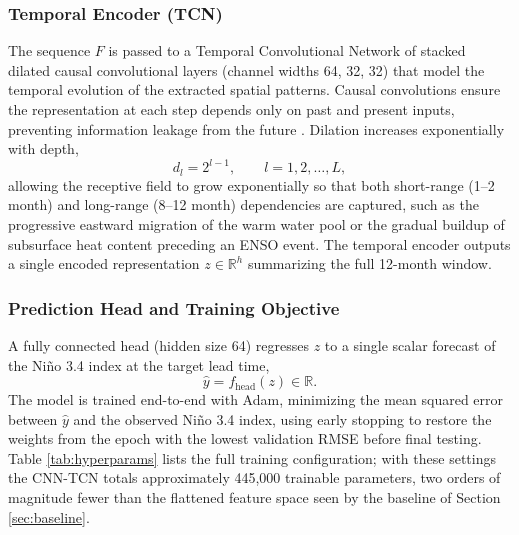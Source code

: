 \documentclass[conference]{IEEEtran}
\begin{document}
\subsubsection{Temporal Encoder (TCN)}
The sequence $F$ is passed to a Temporal Convolutional Network of stacked dilated causal convolutional layers (channel widths 64, 32, 32) that model the temporal evolution of the extracted spatial patterns. Causal convolutions ensure the representation at each step depends only on past and present inputs, preventing information leakage from the future \cite{bai2018}. Dilation increases exponentially with depth,
\begin{equation}
d_l = 2^{l-1}, \qquad l = 1, 2, \ldots, L,
\label{eq:dilation}
\end{equation}
allowing the receptive field to grow exponentially so that both short-range (1--2 month) and long-range (8--12 month) dependencies are captured, such as the progressive eastward migration of the warm water pool or the gradual buildup of subsurface heat content preceding an ENSO event. The temporal encoder outputs a single encoded representation $z \in \mathbb{R}^h$ summarizing the full 12-month window.

\subsubsection{Prediction Head and Training Objective}
A fully connected head (hidden size 64) regresses $z$ to a single scalar forecast of the Ni\~no 3.4 index at the target lead time,
\begin{equation}
\hat{y} = f_{\mathrm{head}}(z) \in \mathbb{R}.
\label{eq:head}
\end{equation}
The model is trained end-to-end with Adam, minimizing the mean squared error between $\hat{y}$ and the observed Ni\~no 3.4 index, using early stopping to restore the weights from the epoch with the lowest validation RMSE before final testing. Table \ref{tab:hyperparams} lists the full training configuration; with these settings the CNN-TCN totals approximately 445{,}000 trainable parameters, two orders of magnitude fewer than the flattened feature space seen by the baseline of Section \ref{sec:baseline}.
\end{document}
